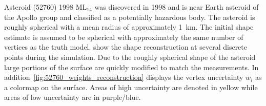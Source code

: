 \documentclass[letterpaper, paper,11pt]{AAS}		%
\begin{document}
Asteroid (\num{52760}) \num{1998} \(\text{ML}_{14}\) was discovered in \num{1998} and is near Earth asteroid of the Apollo group and classified as a potentially hazardous body.
The asteroid is roughly spherical with a mean radius of approximately \SI{1}{\kilo\meter}.
The initial shape estimate is assumed to be spherical with approximately the same number of vertices as the truth model.
 show the shape reconstruction at several discrete points during the simulation.
Due to the roughly spherical shape of the asteroid large portions of the surface are quickly modified to match the measurements.
In addition~\cref{fig:52760_weights_reconstruction} displays the vertex uncertainty \( w_i \) as a colormap on the surface. 
Areas of high uncertainty are denoted in yellow while areas of low uncertainty are in purple/blue.
\end{document}
